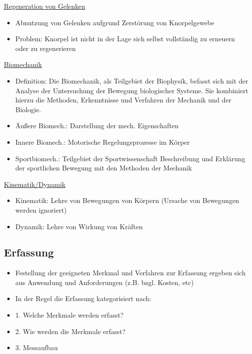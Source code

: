 \documentclass[a4paper,10pt,oneside]{article}
\begin{document}
\underline{Regeneration von Gelenken} \\
	\begin{itemize}
		\item Abnutzung von Gelenken aufgrund Zerstörung von Knorpelgewebe
		\item Problem: Knorpel ist nicht in der Lage sich selbst vollständig zu erneuern oder zu regenerieren
	\end{itemize}
	

\underline{Biomechanik} \\
	\begin{itemize}
		\item Definition: Die Biomechanik, als Teilgebiet der Biophysik, befasst sich mit der Analyse der Untersuchung der Bewegung biologischer Systeme. Sie kombiniert hierzu die Methoden, Erkenntnisse und Verfahren der Mechanik und der Biologie.
		\item Äußere Biomech.: Darstellung der mech. Eigenschaften
		\item Innere Biomech.: Motorische Regelungsprozesse im Körper
		\item Sportbiomech.: Teilgebiet der Sportwissenschaft Beschreibung und Erklärung der sportlichen Bewegung mit den Methoden der Mechanik
	\end{itemize}
	

\underline{Kinematik/Dynamik} \\
	\begin{itemize}
		\item
		 Kinematik: Lehre von Bewegungen von Körpern (Ursache von Bewegungen werden ignoriert)
		\item Dynamik: Lehre von Wirkung von Kräften
	\end{itemize}
 		
\subsection{Erfassung}
	\begin{itemize}
		\item Festellung der geeigneten Merkmal und Verfahren zur Erfassung ergeben sich aus Anwendung und Anforderungen (z.B. bzgl. Kosten, etc)
		\item In der Regel die Erfassung kategorisiert nach:
		\item 1. Welche Merkmale werden erfasst?
		\item 2. Wie werden die Merkmale erfasst?
		\item 3. Messaufbau
	\end{itemize}
 		
\end{document}
